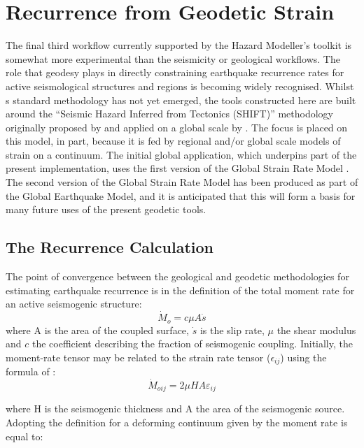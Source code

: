 \section{Recurrence from Geodetic Strain}

The final third workflow currently supported by the Hazard Modeller's toolkit is somewhat more experimental than the seismicity or geological workflows. The role that geodesy plays in directly constraining earthquake recurrence rates for active seismological structures and regions is becoming widely recognised. Whilst s standard methodology has not yet emerged, the tools constructed here are built around the ``Seismic Hazard Inferred from Tectonics (SHIFT)'' methodology originally proposed by \citet{BirdLiu2007} and applied on a global scale by \citet{Bird_etal2010}. The focus is placed on this model, in part, because it is fed by regional and/or global scale models of strain on a continuum. The initial global application, which underpins part of the present implementation, uses the first version of the Global Strain Rate Model \citep{Kreemer_etal2003}. The second version of the Global Strain Rate Model has been produced as part of the Global Earthquake Model, and it is anticipated that this will form a basis for many future uses of the present geodetic tools.

\subsection{The Recurrence Calculation}

The point of convergence between the geological and geodetic methodologies for estimating earthquake recurrence is in the definition of the total moment rate for an active seismogenic structure:
 \begin{equation}
 \dot{M}_o = c \mu A \dot{s}
 \end{equation}
 where A is the area of the coupled surface, $\dot{s}$ is the slip rate, $\mu$ the shear modulus and $c$ the coefficient describing the fraction of seismogenic coupling. Initially, the moment-rate tensor may be related to the strain rate tensor ($\epsilon_{ij}$) using the formula of \cite{Kostrov1974}:
 \begin{equation}
 \dot{M}_{oij} = 2 \mu H A \varepsilon_{ij}
 \end{equation}
 
 where H is the seismogenic thickness and A the area of the seismogenic source. Adopting the definition for a deforming continuum given by \citet{BirdLiu2007} the moment rate is equal to:
 
